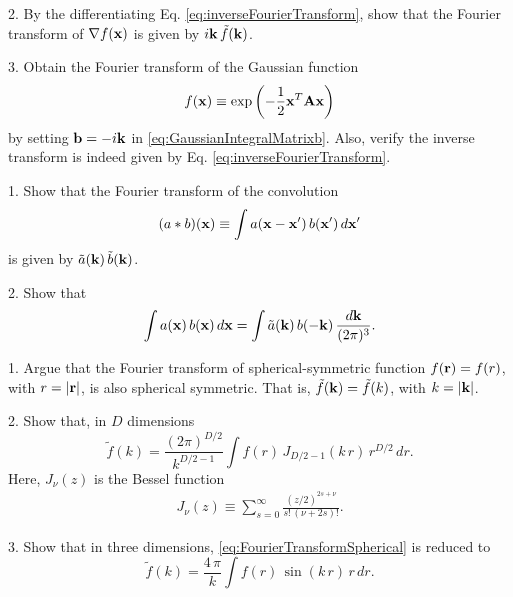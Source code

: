 \documentclass[12pt]{book}
\begin{document}

2. By the differentiating Eq. \eqref{eq:inverseFourierTransform},
show that the Fourier transform of $\nabla f(\boldsymbol{\mathbf{x}})$ is given by $i\boldsymbol{\mathbf{k}} \, \tilde f(\boldsymbol{\mathbf{k}})$.

3. Obtain the Fourier transform of the Gaussian function
\[
  f(\boldsymbol{\mathbf{x}}) \equiv \exp\left( - \frac{1}{2} \boldsymbol{\mathbf{x}}^T \boldsymbol{\mathbf{A}} \boldsymbol{\mathbf{x}} \right)
\]
by setting $\boldsymbol{\mathbf{b}} = -i \boldsymbol{\mathbf{k}}$ in \eqref{eq:GaussianIntegralMatrixb}.
%
Also, verify the inverse transform
is indeed given by Eq. \eqref{eq:inverseFourierTransform}.





1. Show that the Fourier transform of the convolution
\begin{equation}
  (a*b)(\boldsymbol{\mathbf{x}})
\equiv
  \int a(\boldsymbol{\mathbf{x}} - \boldsymbol{\mathbf{x}}') \, b(\boldsymbol{\mathbf{x}}') \, d\boldsymbol{\mathbf{x}}'
  \label{eq:convolution}
\end{equation}
is given by $\tilde{a}(\boldsymbol{\mathbf{k}}) \, \tilde{b}(\boldsymbol{\mathbf{k}})$.

2. Show that
\begin{equation}
  \int a(\boldsymbol{\mathbf{x}}) \, b(\boldsymbol{\mathbf{x}}) \, d\boldsymbol{\mathbf{x}}
=
  \int \tilde{a}(\boldsymbol{\mathbf{k}}) \, b(-\boldsymbol{\mathbf{k}}) \, \frac{ d \boldsymbol{\mathbf{k}} }{(2\pi)^3}.
\end{equation}





1. Argue that the Fourier transform of spherical-symmetric function
$f(\boldsymbol{\mathbf{r}}) = f(r)$, with $r = |\boldsymbol{\mathbf{r}}|$,
is also spherical symmetric.
%
That is, $\tilde f(\boldsymbol{\mathbf{k}}) = \tilde f(k)$, with $k = |\boldsymbol{\mathbf{k}}|$.

2. Show that, in $D$ dimensions
\begin{equation}
  \tilde f(k)
=
  \frac{(2 \pi)^{D/2}} {k^{D/2 - 1}}
  \int
  f(r) \,
  J_{D/2-1}(k\,r) \,
  r^{D/2} \,
  dr.
  \label{eq:FourierTransformSpherical}
\end{equation}
Here, $J_\nu(z)$ is the Bessel function
\begin{align}
  J_\nu(z)
\equiv
  \sum_{s = 0}^\infty
  \frac{ (z/2)^{2s + \nu } }
  { s! \, (\nu + 2 s)! }.
  \label{eq:Bessel}
\end{align}

3. Show that in three dimensions,
\eqref{eq:FourierTransformSpherical}
is reduced to
\begin{equation}
  \tilde f(k)
=
\frac{ 4 \, \pi } {k}
  \int
  f(r) \,
  \sin(k\,r) \,
  r \,
  dr.
  \label{eq:FourierTransformSpherical3D}
\end{equation}
\end{document}
